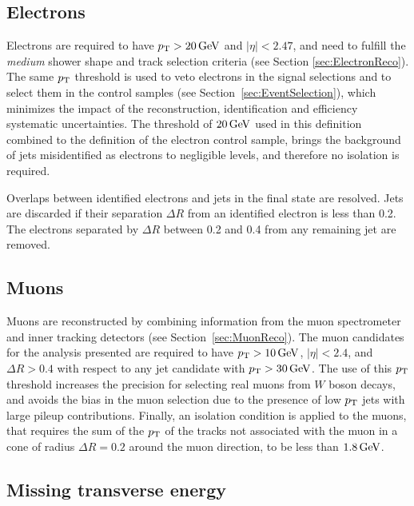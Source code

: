 \subsection{Electrons}
    \label{subsec:ElectronDefinition}

Electrons are required to have $\pt>\unit[20]{GeV}$ and $|\eta|<2.47$, and need to fulfill the \emph{medium} shower shape and track selection criteria (see Section \ref{sec:ElectronReco}).
The same $p_{\mathrm{T}}$ threshold is used to veto electrons in the signal selections and to select them in the control samples (see Section~\ref{sec:EventSelection}), which minimizes the impact of the reconstruction, identification and efficiency systematic uncertainties.
The threshold of $\unit[20]{GeV}$ used in this definition combined to the definition of the electron control sample, brings the background of jets misidentified as electrons to negligible levels, and therefore no isolation is required.

Overlaps between identified electrons and jets in the final state are resolved.
Jets are discarded if their separation $\Delta R$ from an identified electron is less than 0.2.
The electrons separated by $\Delta R$ between 0.2 and 0.4 from any remaining jet are removed.


\subsection{Muons}
    \label{subsec:MuonDefinition}

Muons are reconstructed by combining information from the muon spectrometer and inner tracking detectors (see Section~\ref{sec:MuonReco}).
The muon candidates for the analysis presented are required to have $\pt>\unit[10]{GeV}$, $|\eta|<2.4$, and $\Delta R > 0.4$ with respect to any jet candidate with $\pt > \unit[30]{GeV}$.
The use of this $p_{\mathrm{T}}$ threshold increases the precision for selecting real muons from $W$ boson decays, and avoids the bias in the muon selection due to the presence of low $p_{\mathrm{T}}$ jets with large pileup contributions.
Finally, an isolation condition is applied to the muons, that requires the sum of the $p_{\mathrm{T}}$ of the tracks not associated with the muon in a cone of radius $\Delta R = 0.2$ around the muon direction, to be less than $\unit[1.8]{GeV}$.

\subsection{Missing transverse energy}
    \label{subsec:MetDefinition}

